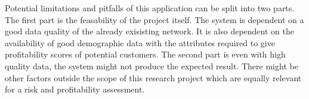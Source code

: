 \documentclass{article}
\begin{document}
Potential limitations and pitfalls of this application can be split into two parts. The first part is the feasability of the project itself. The system is dependent on a good data quality of the already exisisting network. It is also dependent on the availability of good demographic data with the attributes required to give profitability scores of potential customers. The second part is even with high quality data, the system might not produce the expected result. There might be other factors outside the scope of this research project which are equally relevant for a risk and profitability assessment.
\printbibliography
\end{document}
